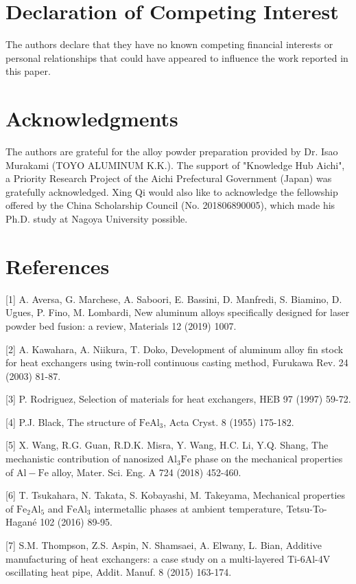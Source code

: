 \documentclass[10pt]{article}
\begin{document}
\section*{Declaration of Competing Interest}
The authors declare that they have no known competing financial interests or personal relationships that could have appeared to influence the work reported in this paper.

\section*{Acknowledgments}
The authors are grateful for the alloy powder preparation provided by Dr. Isao Murakami (TOYO ALUMINUM K.K.). The support of "Knowledge Hub Aichi", a Priority Research Project of the Aichi Prefectural Government (Japan) was gratefully acknowledged. Xing Qi would also like to acknowledge the fellowship offered by the China Scholarship Council (No. 201806890005), which made his Ph.D. study at Nagoya University possible.

\section*{References}
[1] A. Aversa, G. Marchese, A. Saboori, E. Bassini, D. Manfredi, S. Biamino, D. Ugues, P. Fino, M. Lombardi, New aluminum alloys specifically designed for laser powder bed fusion: a review, Materials 12 (2019) 1007.

[2] A. Kawahara, A. Niikura, T. Doko, Development of aluminum alloy fin stock for heat exchangers using twin-roll continuous casting method, Furukawa Rev. 24 (2003) 81-87.

[3] P. Rodriguez, Selection of materials for heat exchangers, HEB 97 (1997) 59-72.

[4] P.J. Black, The structure of $\mathrm{FeAl}_{3}$, Acta Cryst. 8 (1955) 175-182.

[5] X. Wang, R.G. Guan, R.D.K. Misra, Y. Wang, H.C. Li, Y.Q. Shang, The mechanistic contribution of nanosized $\mathrm{Al}_{3} \mathrm{Fe}$ phase on the mechanical properties of $\mathrm{Al}-\mathrm{Fe}$ alloy, Mater. Sci. Eng. A 724 (2018) 452-460.

[6] T. Tsukahara, N. Takata, S. Kobayashi, M. Takeyama, Mechanical properties of $\mathrm{Fe}_{2} \mathrm{Al}_{5}$ and $\mathrm{FeAl}_{3}$ intermetallic phases at ambient temperature, Tetsu-To-Hagané 102 (2016) 89-95.

[7] S.M. Thompson, Z.S. Aspin, N. Shamsaei, A. Elwany, L. Bian, Additive manufacturing of heat exchangers: a case study on a multi-layered Ti-6Al-4V oscillating heat pipe, Addit. Manuf. 8 (2015) 163-174.
\end{document}
